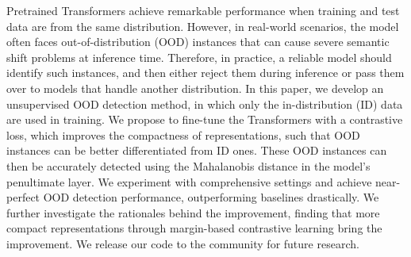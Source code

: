 Pretrained Transformers achieve remarkable performance when training and test data are from the same distribution. However, in real-world scenarios, the model often faces out-of-distribution (OOD) instances that can cause severe semantic shift problems at inference time. Therefore, in practice, a reliable model should identify such instances, and then either reject them during inference or pass them over to models that handle another distribution. In this paper, we develop an unsupervised OOD detection method, in which only the in-distribution (ID) data are used in training. We propose to fine-tune the Transformers with a contrastive loss, which improves the compactness of representations, such that OOD instances can be better differentiated from ID ones. These OOD instances can then be accurately detected using the Mahalanobis distance in the model's penultimate layer. We experiment with comprehensive settings and achieve near-perfect OOD detection performance, outperforming baselines drastically. We further investigate the rationales behind the improvement, finding that more compact representations through margin-based contrastive learning bring the improvement. We release our code to the community for future research.
